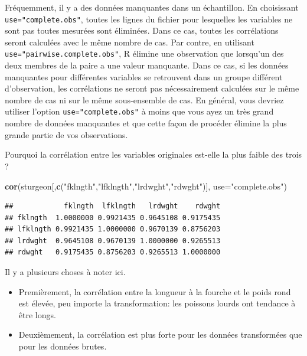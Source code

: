 \documentclass[12pt,]{book}
\newenvironment{Shaded}{\begin{snugshade}}{\end{snugshade}}
\newcommand{\DataTypeTok}[1]{\textcolor[rgb]{0.13,0.29,0.53}{#1}}
\newcommand{\KeywordTok}[1]{\textcolor[rgb]{0.13,0.29,0.53}{\textbf{#1}}}
\newcommand{\NormalTok}[1]{#1}
\newcommand{\StringTok}[1]{\textcolor[rgb]{0.31,0.60,0.02}{#1}}
\providecommand{\tightlist}{%
  \setlength{\itemsep}{0pt}\setlength{\parskip}{0pt}}
\begin{document}
Fréquemment, il y a des données manquantes dans un échantillon.
En choisissant \texttt{use="complete.obs"}, toutes les lignes du fichier pour lesquelles les variables ne sont pas toutes mesurées sont éliminées.
Dans ce cas, toutes les corrélations seront calculées avec le même nombre de cas.
Par contre, en utilisant \texttt{use="pairwise.complete.obs"},
R élimine une observation que lorsqu'un des deux membres de la paire a une valeur manquante.
Dans ce cas, si les données manquantes pour différentes variables se retrouvent dans un groupe différent d'observation, les corrélations ne seront pas nécessairement calculées sur le même nombre de cas ni sur le même sous-ensemble de cas.
En général, vous devriez utiliser l'option \texttt{use="complete.obs"} à moins que vous ayez un très grand nombre de données manquantes et que cette façon de procéder élimine la plus grande partie de vos
observations.

Pourquoi la corrélation entre les variables originales est-elle la plus faible des trois ?

\begin{Shaded}
\begin{Highlighting}[]
\KeywordTok{cor}\NormalTok{(sturgeon[,}\KeywordTok{c}\NormalTok{(}\StringTok{"fklngth"}\NormalTok{,}\StringTok{"lfklngth"}\NormalTok{,}\StringTok{"lrdwght"}\NormalTok{,}\StringTok{"rdwght"}\NormalTok{)], }\DataTypeTok{use=}\StringTok{"complete.obs"}\NormalTok{)}
\end{Highlighting}
\end{Shaded}

\begin{verbatim}
##            fklngth  lfklngth   lrdwght    rdwght
## fklngth  1.0000000 0.9921435 0.9645108 0.9175435
## lfklngth 0.9921435 1.0000000 0.9670139 0.8756203
## lrdwght  0.9645108 0.9670139 1.0000000 0.9265513
## rdwght   0.9175435 0.8756203 0.9265513 1.0000000
\end{verbatim}

Il y a plusieurs choses à noter ici.

\begin{itemize}
\tightlist
\item
  Premièrement, la corrélation entre la longueur à la fourche et le poids rond est élevée, peu importe la transformation: les poissons lourds ont tendance à être longs.
\item
  Deuxièmement, la corrélation est plus forte pour les données
  transformées que pour les données brutes.
\end{itemize}
\end{document}
